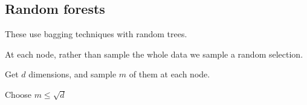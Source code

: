 
\subsection{Random forests}

These use bagging techniques with random trees.

At each node, rather than sample the whole data we sample a random selection.

Get \(d\) dimensions, and sample \(m\) of them at each node.

Choose \(m\le \sqrt d\)


